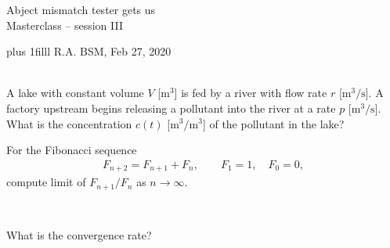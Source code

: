 \documentclass[onepage, 12pt]{beamer}
\author{RA}
\def\Bottom#1{\vskip 0pt plus 1filll #1}
\begin{document}


\begin{frame}[plain,t]
	\begin{center}
        \vspace{1cm}
		Abject mismatch tester gets us
		\\
		{\small\color{gray} Masterclass -- session III}

		\vspace{1cm}

	\end{center}
	
	
	\Bottom{
		\scriptsize
		R.A.
		\hfill
		BSM, Feb 27, 2020
		\\ {\ }
	}
\end{frame}







\begin{frame}{}{}
    A lake with constant volume $V$ [$\mathrm{m^3}$]
    is fed by a river with flow rate $r$ [$\mathrm{m^3/s}$].
    A factory upstream begins releasing a pollutant
    into the river at a rate $p$ [$\mathrm{m^3/s}$].
    What is the concentration $c(t)$ [$\mathrm{m^3/m^3}$] of the pollutant in the lake?
\end{frame}


\begin{frame}{}{}
    For the Fibonacci sequence 
    \begin{align*}
        F_{n + 2} = F_{n + 1} + F_n,
        \qquad
        F_1 = 1,
        \quad
        F_0 = 0,
    \end{align*}
    compute limit of $F_{n+1} / F_n$ as $n \to \infty$.
    
    {\ }
    
    \pause
    
    What is the convergence rate?
\end{frame}
\end{document}
